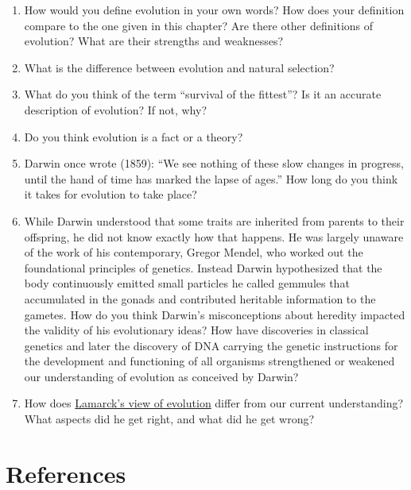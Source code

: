 \documentclass[
]{book}
\providecommand{\tightlist}{%
  \setlength{\itemsep}{0pt}\setlength{\parskip}{0pt}}
\begin{document}
\begin{enumerate}
\def\labelenumi{\arabic{enumi}.}
\tightlist
\item
  How would you define evolution in your own words? How does your definition compare to the one given in this chapter? Are there other definitions of evolution? What are their strengths and weaknesses?
\item
  What is the difference between evolution and natural selection?
\item
  What do you think of the term ``survival of the fittest''? Is it an accurate description of evolution? If not, why?
\item
  Do you think evolution is a fact or a theory?
\item
  Darwin once wrote (1859): ``We see nothing of these slow changes in progress, until the hand of time has marked the lapse of ages.'' How long do you think it takes for evolution to take place?
\item
  While Darwin understood that some traits are inherited from parents to their offspring, he did not know exactly how that happens. He was largely unaware of the work of his contemporary, Gregor Mendel, who worked out the foundational principles of genetics. Instead Darwin hypothesized that the body continuously emitted small particles he called gemmules that accumulated in the gonads and contributed heritable information to the gametes. How do you think Darwin's misconceptions about heredity impacted the validity of his evolutionary ideas? How have discoveries in classical genetics and later the discovery of DNA carrying the genetic instructions for the development and functioning of all organisms strengthened or weakened our understanding of evolution as conceived by Darwin?
\item
  How does \href{https://en.wikipedia.org/wiki/Lamarckism}{Lamarck's view of evolution} differ from our current understanding? What aspects did he get right, and what did he get wrong?
\end{enumerate}

\hypertarget{references-1}{%
\section{References}\label{references-1}}
\end{document}

